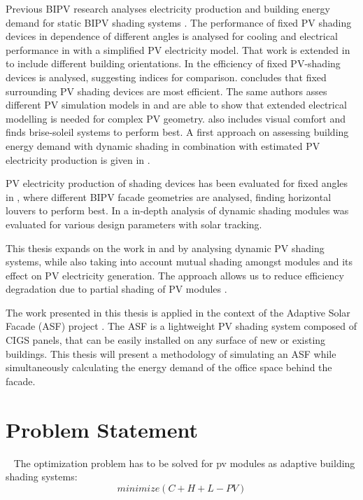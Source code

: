 	Previous BIPV research analyses electricity production and building energy demand for static BIPV shading systems \cite{sun2010, sun2012, David2011, mandalaki2012assessment, Mandalaki2014complexPV, mandalaki2014assessment, yoo2011available, jayathissa2015abs}. The performance of fixed PV shading devices in dependence of different angles is analysed for cooling and electrical performance in \cite{sun2010} with a simplified PV electricity model. That work is extended in \cite{sun2012} to include different building orientations. In \cite{David2011} the efficiency of fixed PV-shading devices is analysed, suggesting indices for comparison. \cite{mandalaki2012assessment} concludes that fixed surrounding PV shading devices are most efficient. The same authors asses different PV simulation models in \cite{Mandalaki2014complexPV} and are able to show that extended electrical modelling is needed for complex PV geometry. \cite{mandalaki2014assessment} also includes visual comfort and finds brise-soleil systems to perform best. A first approach on assessing building energy demand with dynamic shading in combination with estimated PV electricity production is given in \cite{jayathissa2015abs}. 

	PV electricity production of shading devices has been evaluated for fixed angles in \cite{freitas2015maximizing}, where different BIPV facade geometries are analysed, finding horizontal louvers to perform best. In \cite{hofer2015PVSEC} a in-depth analysis of dynamic shading modules was evaluated for various design parameters with solar tracking. 

	This thesis expands on the work in \cite{jayathissa2015abs} and \cite{hofer2015PVSEC} by analysing dynamic PV shading systems, while also taking into account mutual shading amongst modules and its effect on PV electricity generation. The approach allows us to reduce efficiency degradation due to partial shading of PV modules \cite{hofer2015PVSEC}.

	The work presented in this thesis is applied in the context of the Adaptive Solar Facade (ASF) project \cite{nagy2015frontiers}. The ASF is a lightweight PV shading system composed of CIGS panels, that can be easily installed on any surface of new or existing buildings. This thesis will present a methodology of simulating an ASF while simultaneously calculating the energy demand of the office space behind the facade.


\section{Problem Statement}\
	The optimization problem has to be solved for pv modules as adaptive building shading systems:\\
	\begin{equation}
			minimize(C+H+L-PV)
	      	\label{e:minimize}
	\end{equation}

